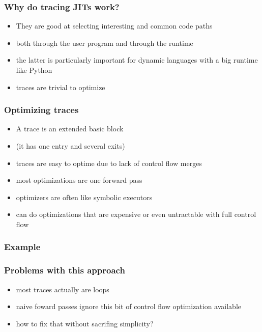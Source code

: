 \documentclass[utf8x]{beamer}
\begin{document}
\begin{frame}
  \frametitle{Why do tracing JITs work?}
  \begin{itemize}
      \item They are good at selecting interesting and common code paths
      \item both through the user program and through the runtime
      \item the latter is particularly important for dynamic languages with a big runtime like Python
          \pause
      \item traces are trivial to optimize
  \end{itemize}
\end{frame}

\begin{frame}
  \frametitle{Optimizing traces}
  \begin{itemize}
      \item A trace is an extended basic block
      \item (it has one entry and several exits)
      \item traces are easy to optime due to lack of control flow merges
      \item most optimizations are one forward pass
      \item optimizers are often like symbolic executors
      \item can do optimizations that are expensive or even untractable with full control flow
  \end{itemize}
\end{frame}

\begin{frame}
  \frametitle{Example}
\end{frame}


\begin{frame}
  \frametitle{Problems with this approach}
  \begin{itemize}
      \item most traces actually are loops
      \item naive foward passes ignore this bit of control flow optimization available
      \item how to fix that without sacrifing simplicity?
  \end{itemize}
\end{frame}
\end{document}
